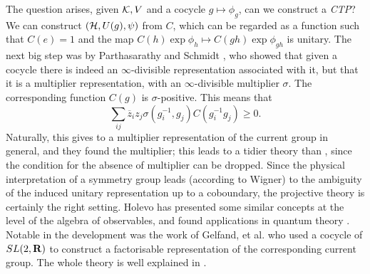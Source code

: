 The question arises, given ${\cal K},V$ and a cocycle $g\mapsto \phi_g$,
can we construct a {\em CTP}? We can construct $({\cal H},
U(g),\psi)$ from $C$, which can be regarded as a function such that
$C(e)=1$ and the map $C(h)\exp\phi_h\mapsto C(gh)\exp\phi_{gh}$ is unitary.
The next big step was by
Parthasarathy and Schmidt \cite{Partha}, who showed that given a cocycle
there is indeed an $\infty$-divisible representation associated with it,
but that it is a multiplier representation, with an $\infty$-divisible
multiplier $\sigma$. The corresponding function $C(g)$ is $\sigma$-positive.
This means that
\begin{equation}
\sum_{ij}\overline{z}_iz_j\sigma(g_i^{-1},g_j)C(g_i^{-1}g_j)\geq0.
\end{equation}
Naturally, this gives to a multiplier representation of the current group
in general, and they found the multiplier; this leads to a tidier theory than
\cite{Araki}, since the condition for the absence of multiplier can be
dropped. Since the physical interpretation of a symmetry group
leads (according to Wigner\cite{Wigner}) to the ambiguity of the
induced unitary representation up to a coboundary, the projective theory
is certainly the right setting. Holevo has presented some similar
concepts at the level of the algebra of observables, and found applications
in quantum theory \cite{Holevo}. Notable in the development was the work of Gelfand, et al.
\cite{Gelfand} who used a cocycle of $SL(2,{\bf R})$ to construct a
factorisable representation of the corresponding current group.
The whole theory is well explained in \cite{Guichardet2,Erven}.

